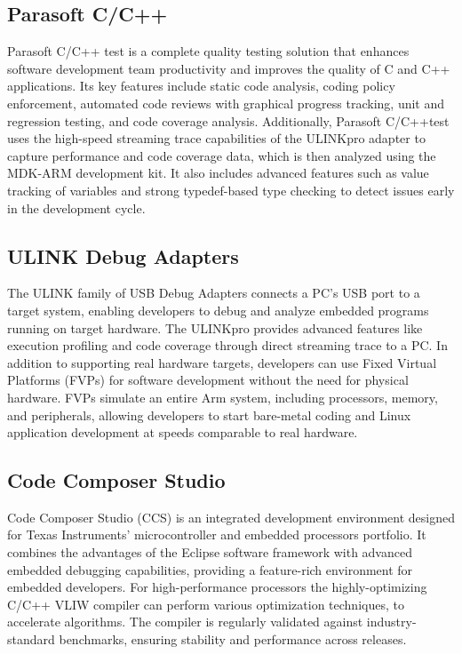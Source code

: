 \subsection{Parasoft C/C++}
Parasoft C/C++ test is a complete quality testing solution that enhances software development team productivity and improves the quality of C and C++ applications. 
Its key features include static code analysis, coding policy enforcement, automated code reviews with graphical progress tracking, unit and regression testing, and code coverage analysis.
Additionally, Parasoft C/C++test uses the high-speed streaming trace capabilities of the ULINKpro adapter to capture performance and code coverage data, which is then analyzed using the MDK-ARM development kit. 
It also includes advanced features such as value tracking of variables and strong typedef-based type checking to detect issues early in the development cycle.

\subsection{ULINK Debug Adapters}
The ULINK family of USB Debug Adapters connects a PC's USB port to a target system, enabling developers to debug and analyze embedded programs running on target hardware. 
The ULINKpro provides advanced features like execution profiling and code coverage through direct streaming trace to a PC. 
In addition to supporting real hardware targets, developers can use Fixed Virtual Platforms (FVPs) for software development without the need for physical hardware. 
FVPs simulate an entire Arm system, including processors, memory, and peripherals, allowing developers to start bare-metal coding and Linux application development at speeds comparable to real hardware.

\subsection{Code Composer Studio}
Code Composer Studio (CCS) is an integrated development environment designed for Texas Instruments' microcontroller and embedded processors portfolio.  
It combines the advantages of the Eclipse software framework with advanced embedded debugging capabilities, providing a feature-rich environment for embedded developers.
For high-performance processors the highly-optimizing C/C++ VLIW compiler can perform various optimization techniques, to accelerate algorithms. 
The compiler is regularly validated against industry-standard benchmarks, ensuring stability and performance across releases.

